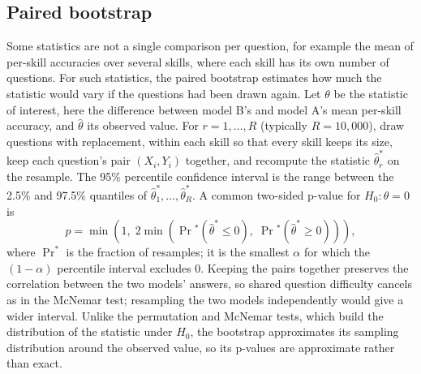 {\subsection*{Paired bootstrap}
Some statistics are not a single comparison per question, for example the mean of per-skill accuracies over several skills, where each skill has its own number of questions.
For such statistics, the paired bootstrap estimates how much the statistic would vary if the questions had been drawn again.
Let \(\theta\) be the statistic of interest, here the difference between model B's and model A's mean per-skill accuracy, and \(\hat\theta\) its observed value.
For \(r = 1, \ldots, R\) (typically \(R = 10{,}000\)), draw questions with replacement, within each skill so that every skill keeps its size, keep each question's pair \((X_i, Y_i)\) together, and recompute the statistic \(\hat\theta^*_r\) on the resample.
The 95\% percentile confidence interval is the range between the 2.5\% and 97.5\% quantiles of \(\hat\theta^*_1, \ldots, \hat\theta^*_R\).
A common two-sided p-value for \(H_0: \theta = 0\) is
\[
p = \min\left(1,\; 2\min\left(\Pr{}^*(\hat\theta^* \le 0),\; \Pr{}^*(\hat\theta^* \ge 0)\right)\right),
\]
where \(\Pr^*\) is the fraction of resamples; it is the smallest \(\alpha\) for which the \((1-\alpha)\) percentile interval excludes 0.
Keeping the pairs together preserves the correlation between the two models' answers, so shared question difficulty cancels as in the McNemar test; resampling the two models independently would give a wider interval.
Unlike the permutation and McNemar tests, which build the distribution of the statistic under \(H_0\), the bootstrap approximates its sampling distribution around the observed value, so its p-values are approximate rather than exact.
}
